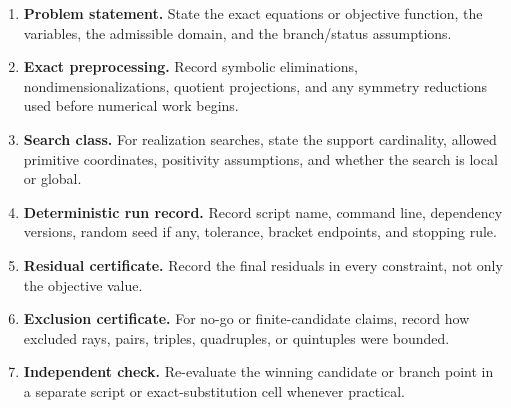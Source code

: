 \begin{enumerate}[leftmargin=2.4em]
\item \textbf{Problem statement.}  State the exact equations or objective function, the variables, the admissible domain, and the branch/status assumptions.
\item \textbf{Exact preprocessing.}  Record symbolic eliminations, nondimensionalizations, quotient projections, and any symmetry reductions used before numerical work begins.
\item \textbf{Search class.}  For realization searches, state the support cardinality, allowed primitive coordinates, positivity assumptions, and whether the search is local or global.
\item \textbf{Deterministic run record.}  Record script name, command line, dependency versions, random seed if any, tolerance, bracket endpoints, and stopping rule.
\item \textbf{Residual certificate.}  Record the final residuals in every constraint, not only the objective value.
\item \textbf{Exclusion certificate.}  For no-go or finite-candidate claims, record how excluded rays, pairs, triples, quadruples, or quintuples were bounded.
\item \textbf{Independent check.}  Re-evaluate the winning candidate or branch point in a separate script or exact-substitution cell whenever practical.
\end{enumerate}

